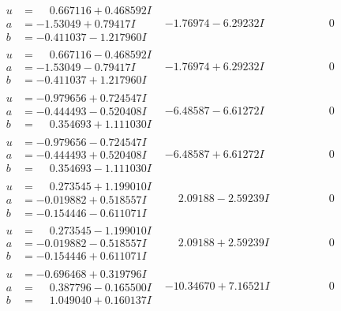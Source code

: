 \documentclass[1p]{elsarticle_modified}
\theoremstyle{definition}
\begin{document}
$$\begin{array}{c|c|c}
\begin{aligned}
u &= \phantom{-}0.667116 + 0.468592 I \\
a &= -1.53049 + 0.79417 I \\
b &= -0.411037 - 1.217960 I\end{aligned}
 & -1.76974 - 6.29232 I & \phantom{-0.000000 } 0 \\ \hline\begin{aligned}
u &= \phantom{-}0.667116 - 0.468592 I \\
a &= -1.53049 - 0.79417 I \\
b &= -0.411037 + 1.217960 I\end{aligned}
 & -1.76974 + 6.29232 I & \phantom{-0.000000 } 0 \\ \hline\begin{aligned}
u &= -0.979656 + 0.724547 I \\
a &= -0.444493 - 0.520408 I \\
b &= \phantom{-}0.354693 + 1.111030 I\end{aligned}
 & -6.48587 - 6.61272 I & \phantom{-0.000000 } 0 \\ \hline\begin{aligned}
u &= -0.979656 - 0.724547 I \\
a &= -0.444493 + 0.520408 I \\
b &= \phantom{-}0.354693 - 1.111030 I\end{aligned}
 & -6.48587 + 6.61272 I & \phantom{-0.000000 } 0 \\ \hline\begin{aligned}
u &= \phantom{-}0.273545 + 1.199010 I \\
a &= -0.019882 + 0.518557 I \\
b &= -0.154446 - 0.611071 I\end{aligned}
 & \phantom{-}2.09188 - 2.59239 I & \phantom{-0.000000 } 0 \\ \hline\begin{aligned}
u &= \phantom{-}0.273545 - 1.199010 I \\
a &= -0.019882 - 0.518557 I \\
b &= -0.154446 + 0.611071 I\end{aligned}
 & \phantom{-}2.09188 + 2.59239 I & \phantom{-0.000000 } 0 \\ \hline\begin{aligned}
u &= -0.696468 + 0.319796 I \\
a &= \phantom{-}0.387796 - 0.165500 I \\
b &= \phantom{-}1.049040 + 0.160137 I\end{aligned}
 & -10.34670 + 7.16521 I & \phantom{-0.000000 } 0 \\ \hline\begin{aligned}

\end{aligned}
\end{array}$$
\end{document}
